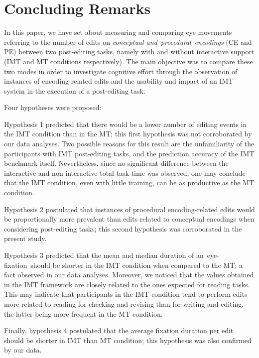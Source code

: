 \documentclass[output=paper]{langsci/langscibook}
\begin{document}
\section{Concluding Remarks\label{alves:sec:ConcludingRemarks}}


In this paper, we have set about measuring and comparing eye movements referring to the number of edits on \emph{conceptual and}{~}\emph{procedural}{~}\emph{encodings }(CE and PE) between two post-editing tasks, namely with and without interactive support (IMT and MT conditions respectively). The main objective was to compare these two modes in order to investigate cognitive effort through the observation of instances of encoding-related edits and the usability and impact of an IMT system in the execution of a post-editing task. 



Four hypotheses were proposed: 



Hypothesis 1 predicted that there would be a lower number of editing events in the IMT condition than in the MT; this first hypothesis was not corroborated by our data analyses. Two possible reasons for this result are the unfamiliarity of the participants with IMT post-editing tasks, and the prediction accuracy of the IMT benchmark itself. Nevertheless, since no significant difference between the interactive and non-interactive total task time was observed, one may conclude that the IMT condition, even with little training, can be as productive as the MT condition. 



Hypothesis 2 postulated that instances of procedural encoding-related edits would be proportionally more prevalent than edits related to conceptual encodings when considering post-editing tasks; this second hypothesis was corroborated in the present study. 



Hypothesis 3 predicted that the mean and median duration of an~eye-fixation~should be shorter in the IMT condition when compared to the MT; a fact observed in our data analyses. Moreover, we noticed that the values obtained in the IMT framework are closely related to the ones expected for reading tasks. This may indicate that participants in the IMT condition tend to perform edits more related to reading for checking and revising than for writing and editing, the latter being more frequent in the MT condition.~



Finally, hypothesis 4 postulated that the average fixation duration per edit should be shorter in IMT than MT condition; this hypothesis was also confirmed by our data. 
\end{document}
